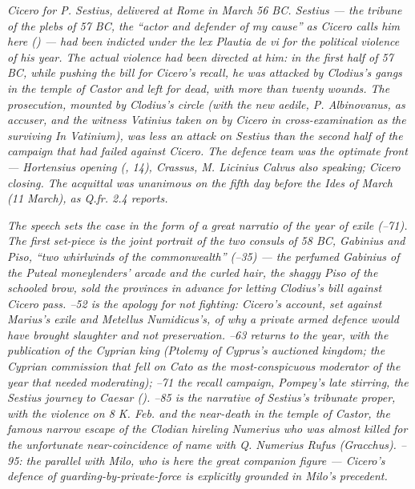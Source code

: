 
\textit{Cicero for P. Sestius, delivered at Rome in March 56
BC. Sestius --- the tribune of the plebs of 57 BC, the
``actor and defender of my cause'' as Cicero calls him here
() --- had been indicted under the lex Plautia
de vi for the political violence of his year. The actual
violence had been directed at him: in the first half of 57
BC, while pushing the bill for Cicero's recall, he was
attacked by Clodius's gangs in the temple of Castor and
left for dead, with more than twenty wounds. The prosecution,
mounted by Clodius's circle (with the new aedile, P. Albinovanus,
as accuser, and the witness Vatinius taken on by Cicero in
cross-examination as the surviving \textit{In Vatinium}),
was less an attack on Sestius than the second half of the
campaign that had failed against Cicero. The defence team
was the optimate front --- Hortensius opening (,
14), Crassus, M. Licinius Calvus also speaking; Cicero
closing. The acquittal was unanimous on the fifth day before
the Ides of March (11 March), as Q.fr. 2.4 reports.}

\textit{The speech sets the case in the form of a great
\textit{narratio} of the year of exile (--71).
The first set-piece is the joint portrait of the two consuls
of 58 BC, Gabinius and Piso, ``two whirlwinds of the
commonwealth'' (--35) --- the perfumed Gabinius
of the Puteal moneylenders' arcade and the curled hair, the
shaggy Piso of the schooled brow, sold the provinces in
advance for letting Clodius's bill against Cicero pass.
--52 is the apology for not fighting:
Cicero's account, set against Marius's exile and Metellus
Numidicus's, of why a private armed defence would have
brought slaughter and not preservation. --63
returns to the year, with the publication of the Cyprian king
(Ptolemy of Cyprus's auctioned kingdom; the Cyprian commission
that fell on Cato as the most-conspicuous moderator of the year
that needed moderating); --71 the recall
campaign, Pompey's late stirring, the Sestius journey to
Caesar (). --85 is the
narrative of Sestius's tribunate proper, with the violence
on 8 K. Feb. and the near-death in the temple of Castor,
the famous narrow escape of the Clodian hireling Numerius
who was almost killed for the unfortunate near-coincidence
of name with Q. Numerius Rufus (Gracchus). --95:
the parallel with Milo, who is here the great companion
figure --- Cicero's defence of guarding-by-private-force is
explicitly grounded in Milo's precedent.}

